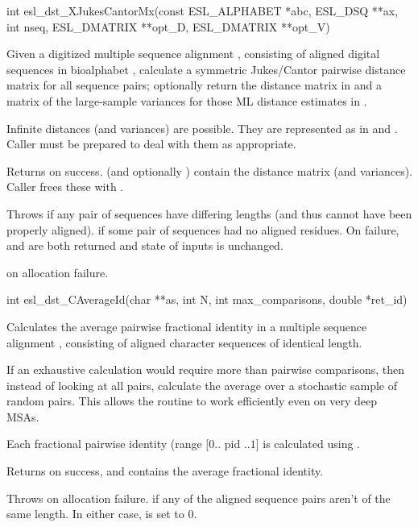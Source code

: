 \begin{sreapi}
\hypertarget{func:esl_dst_XJukesCantorMx()}
{\item[int esl\_dst\_XJukesCantorMx(const ESL\_ALPHABET *abc, ESL\_DSQ **ax, int nseq, 
		       ESL\_DMATRIX **opt\_D, ESL\_DMATRIX **opt\_V)]}

Given a digitized multiple sequence alignment ,
consisting of  aligned digital sequences in
bioalphabet , calculate a symmetric Jukes/Cantor
pairwise distance matrix for all sequence pairs;
optionally return the distance matrix in  and 
a matrix of the large-sample variances for those ML distance
estimates in .

Infinite distances (and variances) are possible. They
are represented as  in  and . Caller must
be prepared to deal with them as appropriate.

Returns  on success.  (and optionally ) contain the
distance matrix (and variances). Caller frees these with
. 

Throws  if any pair of sequences have differing lengths
(and thus cannot have been properly aligned). 
 if some pair of sequences had no aligned
residues. On failure,  and  are both returned 
and state of inputs is unchanged.

 on allocation failure.


\hypertarget{func:esl_dst_CAverageId()}
{\item[int esl\_dst\_CAverageId(char **as, int N, int max\_comparisons, double *ret\_id)]}

Calculates the average pairwise fractional identity in
a multiple sequence alignment , consisting of 
aligned character sequences of identical length.

If an exhaustive calculation would require more than
 pairwise comparisons, then instead of
looking at all pairs, calculate the average over a
stochastic sample of  random pairs.
This allows the routine to work efficiently even on very
deep MSAs.

Each fractional pairwise identity (range $[0..$ pid $..1]$
is calculated using .

Returns  on success, and  contains the average
fractional identity.

Throws  on allocation failure.
 if any of the aligned sequence pairs aren't 
of the same length.
In either case,  is set to 0.



\end{sreapi}
